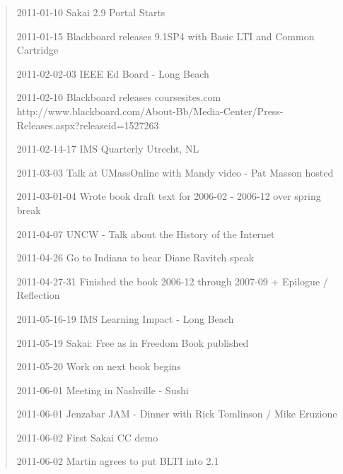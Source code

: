 \begin{quote}
2011-01-10 Sakai 2.9 Portal Starts

2011-01-15 Blackboard releases 9.1SP4 with Basic LTI and Common Cartridge

2011-02-02-03 IEEE Ed Board - Long Beach

2011-02-10 Blackboard releases coursesites.com\\
http://www.blackboard.com/About-Bb/Media-Center/Press-Releases.aspx?releaseid=1527263

2011-02-14-17 IMS Quarterly Utrecht, NL

2011-03-03 Talk at UMassOnline with Mandy video - Pat Masson hosted

2011-03-01-04 Wrote book draft text for 2006-02 - 2006-12 over spring break

2011-04-07 UNCW - Talk about the History of the Internet

2011-04-26 Go to Indiana to hear Diane Ravitch speak

2011-04-27-31 Finished the book 2006-12 through 2007-09 + Epilogue / Reflection

2011-05-16-19 IMS Learning Impact - Long Beach

2011-05-19 Sakai: Free as in Freedom Book published 

2011-05-20 Work on next book begins

2011-06-01 Meeting in Nashville - Sushi

2011-06-01 Jenzabar JAM - Dinner with Rick Tomlinson / Mike Eruzione

2011-06-02 First Sakai CC demo

2011-06-02 Martin agrees to put BLTI into 2.1

\end{quote}
